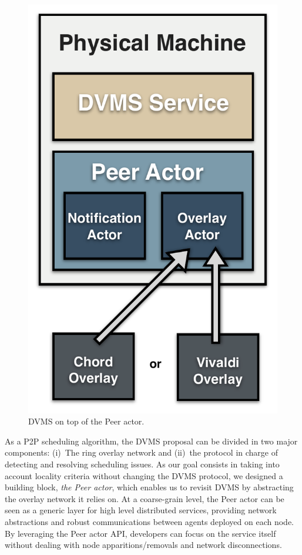 \begin{figure}
\vspace{-.7cm}\hspace*{.2cm}
  \includegraphics[width=\linewidth]{Figures/DVMS.pdf}
  \caption{DVMS on top of the Peer actor.}%
  \label{fig:peeractor}%
\end{figure}

As a P2P scheduling algorithm, the DVMS proposal can be divided in two major
components: (i)~The ring overlay network and (ii)~the protocol in charge
of detecting and resolving scheduling issues. As our goal consists in taking into account
locality criteria without changing the DVMS protocol, we designed a building block, \ie
\emph{the Peer actor}, which enables us to revisit DVMS by abstracting the overlay network it
relies on. At a coarse-grain level, the Peer actor can be seen as a generic layer for high
level distributed services, providing network abstractions and robust communications
between agents deployed on each node. By leveraging the Peer actor API, developers can
focus on the service itself without dealing with node apparitions/removals and network
disconnections.

